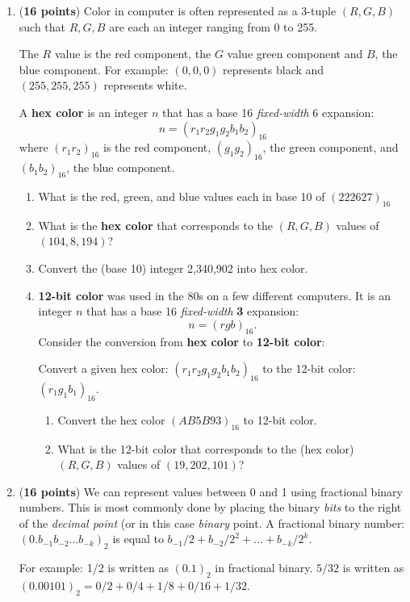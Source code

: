 \documentclass[10pt,letterpaper,unboxed,cm]{article}
\begin{document}
\begin{enumerate}
 
    
\item ({\bf 16 points})
Color in computer is often represented as a 3-tuple $(R,G,B)$ such that $R,G,B$ are each an integer ranging from 0 to 255.

The $R$ value is the red component, the $G$ value green component and $B$, the blue component. For example: $(0,0,0)$ represents black and $(255,255,255)$ represents white.

A {\bf hex color} is an integer $n$ that has a base 16 \emph{fixed-width} 6 expansion: 
$$n = (r_1r_2g_1g_2b_1b_2)_{16}$$
where $(r_1r_2)_{16}$ is the red component, $(g_1g_2)_{16}$, the green component, and $(b_1b_2)_{16}$, the blue component.


\begin{enumerate}
\item
What is the red, green, and blue values each in base 10 of $(222627)_{16}$
\item
What is the {\bf hex color} that corresponds to the $(R,G,B)$ values of $(104,8,194)$?
 \item
 Convert the (base 10) integer 2,340,902 into hex color. 
\item
{\bf 12-bit color} was used in the 80s on a few different computers. It is an integer $n$ that has a base 16 \emph{fixed-width} {\bf 3} expansion:
$$n=(rgb)_{16}.$$
 Consider the conversion from {\bf hex color} to {\bf 12-bit color}:
 
 Convert a given hex color: $(r_1r_2g_1g_2b_1b_2)_{16}$ to the 12-bit color: $(r_1g_1b_1)_{16}$.
 \begin{enumerate}
 \item
 Convert the hex color $(AB5B93)_{16}$ to 12-bit color.
\item
What is the 12-bit color that corresponds to the (hex color) $(R,G,B)$ values of $(19,202,101)$?
 \end{enumerate}
\end{enumerate}    
    
 \item({\bf 16 points})
We can represent values between 0 and 1 using fractional binary numbers. This is most commonly done by placing the binary \emph{bits} to the right of the \emph{decimal point} (or in this case \emph{binary} point.
A fractional binary number: $(0.b_{-1}b_{-2}\dots b_{-k})_2$ is equal to $b_{-1}/2 + b_{-2}/2^2 + \dots + b_{-k}/2^k$.

For example: 1/2 is written as $(0.1)_2$ in fractional binary.  $5/32$ is written as $(0.00101)_2 = 0/2 + 0/4 + 1/8 + 0/16 + 1/32$.


\end{enumerate}
\end{document}
